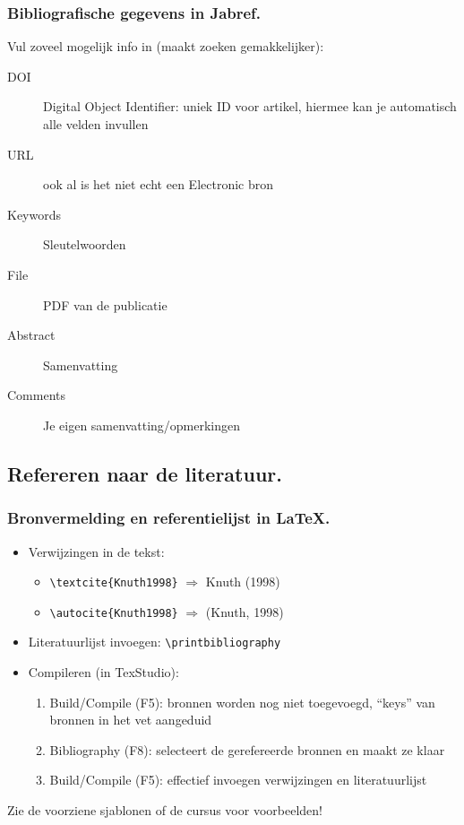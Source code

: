 \documentclass[aspectratio=169]{beamer}
\begin{document}
\begin{frame}
  \frametitle{Bibliografische gegevens in Jabref.}

  Vul zoveel mogelijk info in (maakt zoeken gemakkelijker):

  \begin{description}
    \item[DOI] Digital Object Identifier: uniek ID voor artikel, hiermee kan je automatisch alle velden invullen
    \item[URL] ook al is het niet echt een Electronic bron
    \item[Keywords] Sleutelwoorden
    \item[File] PDF van de publicatie
    \item[Abstract] Samenvatting
    \item[Comments] Je eigen samenvatting/opmerkingen
  \end{description}

\end{frame}

\subsection{Refereren naar de literatuur.}

\begin{frame}[fragile]
  \frametitle{Bronvermelding en referentielijst in {\LaTeX}.}

  \begin{itemize}
    \item Verwijzingen in de tekst:

    \begin{itemize}
      \item \verb|\textcite{Knuth1998}| \(\Rightarrow\) Knuth (1998)
      \item \verb|\autocite{Knuth1998}| \(\Rightarrow\) (Knuth, 1998)
    \end{itemize}

    \item Literatuurlijst invoegen: \verb|\printbibliography|

    \item Compileren (in TexStudio):

    \begin{enumerate}
      \item Build/Compile (F5): bronnen worden nog niet toegevoegd, ``keys'' van bronnen in het vet aangeduid
      \item Bibliography (F8): selecteert de gerefereerde bronnen en maakt ze klaar
      \item Build/Compile (F5): effectief invoegen verwijzingen en literatuurlijst
    \end{enumerate}
  \end{itemize}

  Zie de voorziene sjablonen of de cursus voor voorbeelden!
\end{frame}
\end{document}

